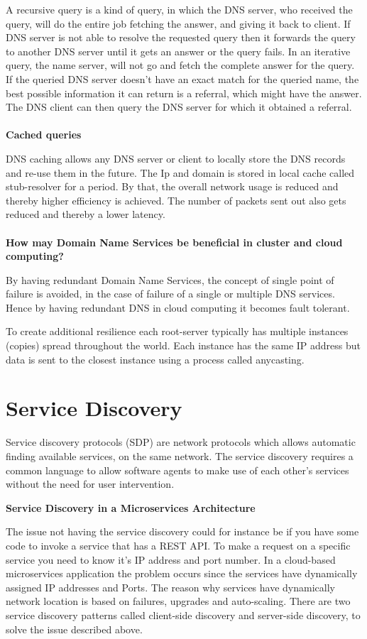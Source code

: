 A recursive query is a kind of query, in which the DNS server, who received the query, will do the entire job fetching the answer, and giving it back to client. If DNS server is not able to resolve the requested query then it forwards the query to another DNS server until it gets an answer or the query fails.
In an iterative query, the name server, will not go and fetch the complete answer for the query. If the queried DNS server doesn't have an exact match for the queried name, the best possible information it can return is a referral, which might have the answer. The DNS client can then query the DNS server for which it obtained a referral.
\\\\
\textbf{Cached queries}

DNS caching allows any DNS server or client to locally store the DNS records and re-use them in the future. The Ip and domain is stored in local cache called stub-resolver for a period. By that, the overall network usage is reduced and thereby higher efficiency is achieved. The number of packets sent out also gets reduced and thereby a lower latency. 
\\\\
\textbf{How may Domain Name Services be beneficial in cluster and cloud computing?}


By having redundant Domain Name Services, the concept of single point of failure is avoided, in the case of failure of a single or multiple DNS services. Hence by having redundant DNS in cloud computing it becomes fault tolerant.  
   

To create additional resilience each root-server typically has multiple instances (copies) spread throughout the world. Each instance has the same IP address but data is sent to the closest instance using a process called anycasting.

\section{Service Discovery}
Service discovery protocols (SDP) are network protocols which allows automatic finding available services, on the same network. The service discovery requires a common language to allow software agents to make use of each other's services without the need for user intervention.


\textbf{Service Discovery in a Microservices Architecture}

The issue not having the service discovery could for instance be if you have some code to invoke a service that has a REST API. To make a request on a specific service you need to know it's IP address and port number. In a cloud-based microservices application the problem occurs since the services have dynamically assigned IP addresses and Ports. The reason why services have dynamically network location is based on failures, upgrades and auto-scaling. There are two service discovery patterns called client-side discovery and server-side discovery, to solve the issue described above.        

